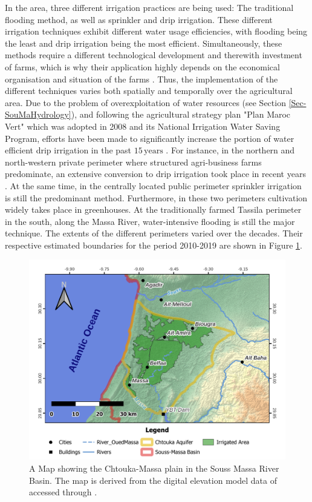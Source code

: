 In the area, three different irrigation practices are being used: The traditional flooding method, as well as sprinkler and drip irrigation. These different irrigation techniques exhibit different water usage efficiencies, with flooding being the least and drip irrigation being the most efficient. Simultaneously, these methods require a different technological development and therewith investment of farms, which is why their application highly depends on the economical organisation and situation of the farms \parencite{Choukr.2017}. Thus, the implementation of the different techniques varies both spatially and temporally over the agricultural area. Due to the problem of overexploitation of water resources (see Section \ref{Sec-SouMaHydrology}), and following the agricultural strategy plan "Plan Maroc Vert" which was adopted in 2008 and its National Irrigation Water Saving Program, efforts have been made to significantly increase the portion of water efficient drip irrigation in the past $15 \, \textrm{years}$ \parencite{MarocVert.2021}. For instance, in the northern and north-western private perimeter where structured agri-business farms predominate, an extensive conversion to drip irrigation took place in recent years \parencite{ABHSMD.2015}. At the same time, in the centrally located public perimeter sprinkler irrigation is still the predominant method. Furthermore, in these two perimeters cultivation widely takes place in greenhouses. At the traditionally farmed Tassila perimeter in the south, along the Massa River, water-intensive flooding is still the major technique. The extents of the different perimeters varied over the decades. Their respective estimated boundaries for the period 2010-2019 are shown in Figure \ref{Map-ChtoukaOverview}.



\begin{figure}[h]
    \centering
    \includegraphics[width=1\textwidth]{./img/Map_ChtoukaOverview.pdf}
    \caption{A Map showing the Chtouka-Massa plain in the Souss Massa River Basin. The map is derived from the digital elevation model data of \cite{NASA.SRTM1Arc} accessed through \cite{USGS.Earthexplorer}.}
    \label{Map-ChtoukaOverview}
\end{figure}